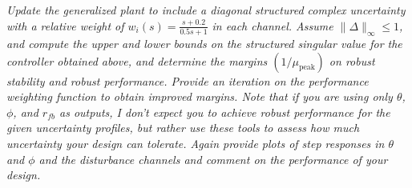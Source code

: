 \documentclass{article}
\begin{document}
\section{}
\textit{Update the generalized plant to include a diagonal structured complex uncertainty with a relative weight of $w_i(s) = \frac{s + 0.2}{0.5 s + 1}$ in each channel. Assume $\|\Delta\|_{\infty} \leq 1$, and compute the upper and lower bounds on the structured singular value for the controller obtained above, and determine the margins $\left(1 / \mu_{\text{peak}}\right)$ on robust stability and robust performance. Provide an iteration on the performance weighting function to obtain improved margins. Note that if you are using only $\theta$, $\phi$, and $r_{fb}$ as outputs, I don't expect you to achieve robust performance for the given uncertainty profiles, but rather use these tools to assess how much uncertainty your design can tolerate. Again provide plots of step responses in $\theta$ and $\phi$ and the disturbance channels and comment on the performance of your design.}
\end{document}

